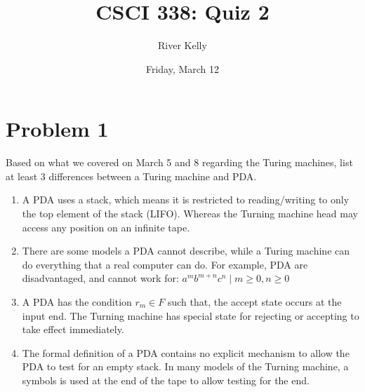 \documentclass[11pt]{article}
\title{CSCI 338: Quiz 2}
\author{River Kelly}
\date{Friday, March 12}
\begin{document}
\maketitle
\section*{Problem 1}
Based on what we covered on March 5 and 8 regarding the Turing machines, list at least 3 differences between a Turing machine and PDA.

\begin{enumerate}
    \item A PDA uses a stack, which means it is restricted to reading/writing to only the top element of the stack (LIFO). Whereas the Turning machine head may access any position on an infinite tape.
    \item There are some models a PDA cannot describe, while a Turing machine can do everything that a real computer can do. For example, PDA are disadvantaged, and cannot work for: \newline $a^{m}b^{m+n}c^{n} \mid m \geq 0, n \geq 0$ 
    \item A PDA has the condition $r_{m} \in F$ such that, the accept state occurs at the input end. The Turning machine has special state for rejecting or accepting to take effect immediately.
    \item The formal definition of a PDA contains no explicit mechanism to allow the PDA to test for an empty stack. In many models of the Turning machine, a symbols is used at the end of the tape to allow testing for the end.
\end{enumerate}
\end{document}
